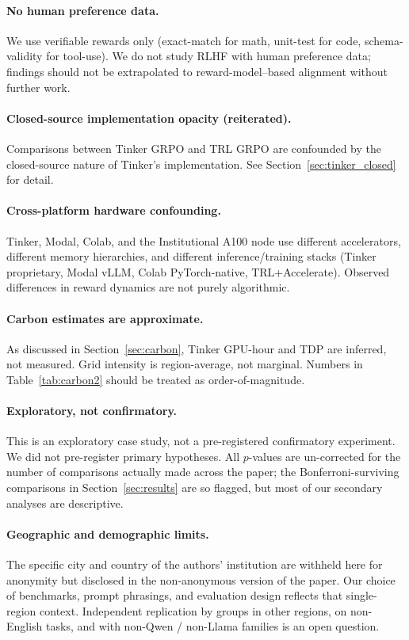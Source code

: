 \documentclass{article}
\begin{document}
\paragraph{No human preference data.}
We use verifiable rewards only (exact-match for math, unit-test for code,
schema-validity for tool-use). We do not study RLHF with human preference
data; findings should not be extrapolated to reward-model--based alignment
without further work.

\paragraph{Closed-source implementation opacity (reiterated).}
Comparisons between Tinker GRPO and TRL GRPO are confounded by the
closed-source nature of Tinker's implementation. See
Section~\ref{sec:tinker_closed} for detail.

\paragraph{Cross-platform hardware confounding.}
Tinker, Modal, Colab, and the Institutional A100 node use different accelerators,
different memory hierarchies, and different inference/training stacks
(Tinker proprietary, Modal vLLM, Colab PyTorch-native, TRL+Accelerate).
Observed differences in reward dynamics are not purely algorithmic.

\paragraph{Carbon estimates are approximate.}
As discussed in Section~\ref{sec:carbon}, Tinker GPU-hour and TDP are
inferred, not measured. Grid intensity is region-average, not marginal.
Numbers in Table~\ref{tab:carbon2} should be treated as
order-of-magnitude.

\paragraph{Exploratory, not confirmatory.}
This is an exploratory case study, not a pre-registered confirmatory
experiment. We did not pre-register primary hypotheses. All $p$-values are
un-corrected for the number of comparisons actually made across the
paper; the Bonferroni-surviving comparisons in
Section~\ref{sec:results} are so flagged, but most of our secondary
analyses are descriptive.

\paragraph{Geographic and demographic limits.}
The specific city and country of the authors' institution are withheld
here for anonymity but disclosed in the non-anonymous version of the
paper. Our choice of benchmarks, prompt phrasings, and evaluation design
reflects that single-region context. Independent replication by groups
in other regions, on non-English tasks, and with non-Qwen / non-Llama
families is an open question.
\end{document}
